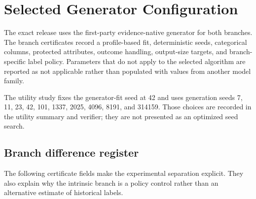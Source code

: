 \section{Selected Generator Configuration}

The exact release uses the first-party evidence-native generator for both branches. The branch
certificates record a profile-based fit, deterministic seeds, categorical columns, protected
attributes, outcome handling, output-size targets, and branch-specific label policy. Parameters
that do not apply to the selected algorithm are reported as not applicable rather than populated
with values from another model family.

\begin{table}[htbp]
  \centering
  \small
  
  \caption{Branch generator configuration and selection disposition derived from the exact v5.0.1
  certificates.}
  \label{tab:generator-config}
\end{table}

The utility study fixes the generator-fit seed at 42 and uses generation seeds 7, 11, 23, 42, 101,
1337, 2025, 4096, 8191, and 314159. Those choices are recorded in the utility summary and verifier;
they are not presented as an optimized seed search.

\subsection*{Branch difference register}
The following certificate fields make the experimental separation explicit. They also explain why
the intrinsic branch is a policy control rather than an alternative estimate of historical labels.

